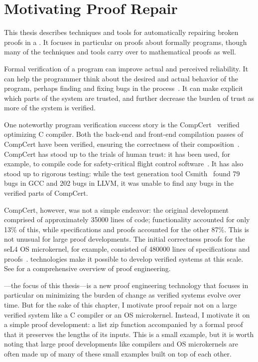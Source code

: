 \chapter{Motivating Proof Repair}
\label{chapt:mot}

This thesis describes techniques and tools for automatically repairing broken proofs in a .
It focuses in particular on proofs about formally  programs, though many of the techniques and tools carry over to mathematical proofs as well.

Formal verification of a program can improve actual and perceived reliability.
It can help the programmer think about the desired and actual behavior of the program,
perhaps finding and fixing bugs in the process~\cite{murraybp}.
It can make explicit which parts of the system are trusted, and further decrease the burden
of trust as more of the system is verified.

One noteworthy program verification success story is the CompCert~\cite{Leroy:POPL06, Leroy2009} verified optimizing C compiler.
Both the back-end and front-end compilation passes
of CompCert have been verified, ensuring the correctness of their composition~\cite{Kaestner2017}.
CompCert has stood up to the trials of human trust: it has been used, for example, to compile code for safety-critical flight control software~\cite{Frana2011}.
It has also stood up to rigorous testing: while the test generation tool Csmith~\cite{Yang2011} found 
79 bugs in GCC and 202 bugs in LLVM, it was unable to find any bugs in the verified parts of CompCert.

CompCert, however, was not a simple endeavor: the original development comprised of approximately 35000 lines of code;
functionality accounted for only 13\% of this, while specifications and proofs accounted for the other 87\%.
This is not unusual for large proof developments. The initial correctness proofs for the seL4 OS microkernel,
for example, consisted of 480000 lines of specifications and proofs~\cite{Klein2014micro}.
 technologies make it possible to develop verified systems at this scale.
See  for a comprehensive overview of proof engineering.

---the focus of this thesis---is a new proof engineering technology that focuses in particular on minimizing the burden of change as verified systems evolve over time.
But for the sake of this chapter, I motivate proof repair not on a large verified system like a C compiler or an OS microkernel.
Instead, I motivate it on a simple proof development: a list zip function accompanied by a formal proof that it preserves the lengths of its inputs.
This is a small example, but it is worth noting that large proof developments like compilers and OS microkernels
are often made up of many of these small examples built on top of each other.

